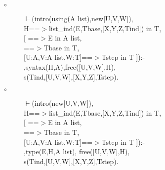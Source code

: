 \documentclass[11pt]{report}
\begin{document}
\begin{enumerate}
 \begin{description}
 \item[$\circ$]
\begin{sf}\begin{tabbing}
$\vdash$(intro(using(A list),new[U,V,W]),\\[-0.15ex]
\hspace{2em}H==$>$list\_\hspace{0.1em}ind(E,Tbase,[X,Y,Z,Tind]) in T,\\[-0.15ex]
\hspace{2em}[ ==$>$E in A list, \\[-0.15ex]
\hspace{3em}==$>$Tbase in T, \\[-0.15ex]
\hspace{3em}[U:A,V:A list,W:T]==$>$Tstep in T ]):-\\[-0.15ex]
\hspace{2em}{\bf derived},syntax(H,A),free([U,V,W],H),\\[-0.15ex]
\hspace{2em}s(Tind,[U,V,W],[X,Y,Z],Tstep).
\end{tabbing}\end{sf}

 \item[$\circ$]
\begin{sf}\begin{tabbing}
$\vdash$(intro(new[U,V,W]),\\[-0.15ex]
\hspace{2em}H==$>$list\_\hspace{0.1em}ind(E,Tbase,[X,Y,Z,Tind]) in T,\\[-0.15ex]
\hspace{2em}[ ==$>$E in A list,\\[-0.15ex]
\hspace{3em}==$>$Tbase in T, \\[-0.15ex]
\hspace{3em}[U:A,V:A list,W:T]==$>$Tstep in T ]):-\\[-0.15ex]
\hspace{2em}{\bf derived},type(E,H,A list), free([U,V,W],H),\\[-0.15ex]
\hspace{2em}s(Tind,[U,V,W],[X,Y,Z],Tstep).
\end{tabbing}\end{sf}

 \end{description}
 \end{enumerate}
  
\end{document}
